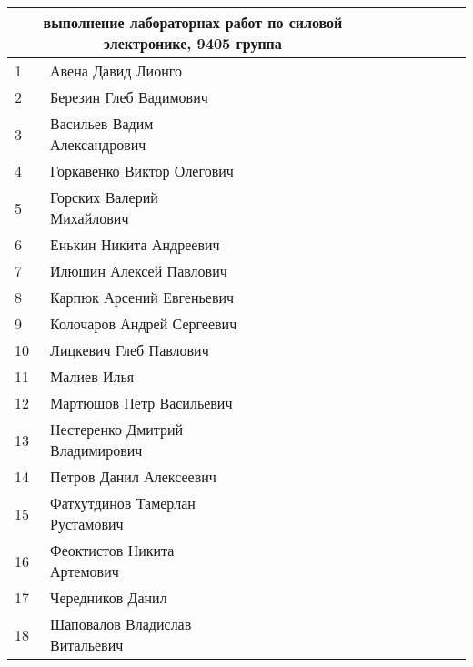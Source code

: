 \newpage
%
\begin{tabular}{l|llccccccccccccc}
\multicolumn{10}{c}{выполнение лабораторнах работ по силовой электронике, 9405 группа} \\
\toprule
1\,&  Авена Давид Лионго              \\
2\,&  Березин Глеб Вадимович          \\
3\,&  Васильев Вадим Александрович    \\
4\,&  Горкавенко Виктор Олегович      \\
\midrule
5\,&  Горских Валерий Михайлович      \\
6\,&  Енькин Никита Андреевич         \\
7\,&  Илюшин Алексей Павлович         \\
8\,&  Карпюк Арсений Евгеньевич       \\
\midrule
9\,&  Колочаров Андрей Сергеевич      \\ 
10\,& Лицкевич Глеб Павлович          \\
11\,& Малиев Илья                     \\
12\,& Мартюшов Петр Васильевич        \\
\midrule
13\,& Нестеренко Дмитрий Владимирович \\
14\,& Петров Данил Алексеевич         \\
15\,& Фатхутдинов Тамерлан Рустамович \\
16\,& Феоктистов Никита Артемович      \\
\midrule
17\,& Чередников Данил                 \\
18\,& Шаповалов Владислав Витальевич   \\
\bottomrule
\end{tabular}


